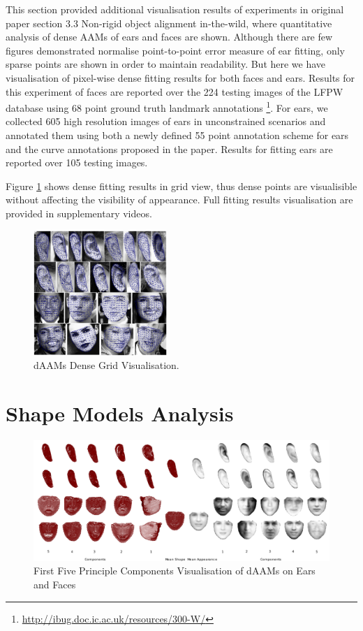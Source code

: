 This section provided additional visualisation results of experiments in original paper section 3.3 Non-rigid object alignment in-the-wild, where quantitative analysis of dense AAMs of ears and faces are shown. Although there are few figures demonstrated normalise point-to-point error measure of ear fitting, only sparse points are shown in order to maintain readability. But here we have visualisation of pixel-wise dense fitting results for both faces and ears. Results for this experiment of faces are reported over the 224 testing images of the LFPW database using 68 point ground truth landmark annotations
\footnote{\label{ibug_300} \url{http://ibug.doc.ic.ac.uk/resources/300-W/}}. 
For ears, we collected 605 high resolution images of ears in unconstrained scenarios and annotated them using both a newly defined 55 point annotation scheme for ears and the curve annotations proposed in the paper. Results for fitting ears are reported over 105 testing images.

Figure \ref{fig:fr} shows dense fitting results in grid view, thus dense points are visualisible without affecting the visibility of appearance. Full fitting results visualisation are provided in supplementary videos.

\begin{figure}[!t]
\centering
\includegraphics[width=0.45\textwidth]{supports/Fittings/fittings}
\caption{dAAMs Dense Grid Visualisation.}
\label{fig:fr}
\end{figure}

\section{Shape Models Analysis}
\label{sec:modelanalysis}

\begin{figure}[!t]
\centering
\includegraphics[width=\textwidth]{supports/Models/models}
\caption{First Five Principle Components Visualisation of dAAMs on Ears and Faces}
\label{fig:pcamodel}
\end{figure}

